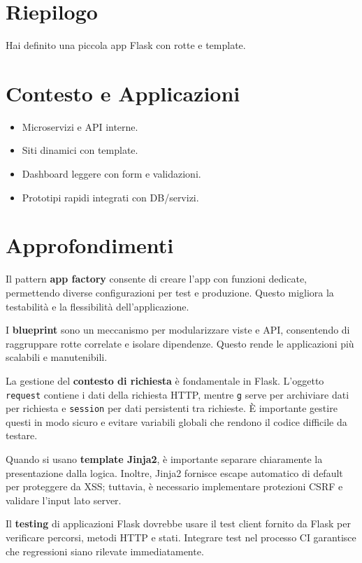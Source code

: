 \section{Riepilogo}
Hai definito una piccola app Flask con rotte e template.

\section{Contesto e Applicazioni}
\begin{tcolorbox}[title=Contesto e Applicazioni]
\begin{itemize}
  \item Microservizi e API interne.
  \item Siti dinamici con template.
  \item Dashboard leggere con form e validazioni.
  \item Prototipi rapidi integrati con DB/servizi.
\end{itemize}
\end{tcolorbox}

\section{Approfondimenti}
\begin{tcolorbox}[title=Spiegazioni dettagliate]
Il pattern \textbf{app factory} consente di creare l'app con funzioni dedicate, permettendo diverse configurazioni per test e produzione. Questo migliora la testabilità e la flessibilità dell'applicazione.

I \textbf{blueprint} sono un meccanismo per modularizzare viste e API, consentendo di raggruppare rotte correlate e isolare dipendenze. Questo rende le applicazioni più scalabili e manutenibili.

La gestione del \textbf{contesto di richiesta} è fondamentale in Flask. L'oggetto \verb|request| contiene i dati della richiesta HTTP, mentre \verb|g| serve per archiviare dati per richiesta e \verb|session| per dati persistenti tra richieste. È importante gestire questi in modo sicuro e evitare variabili globali che rendono il codice difficile da testare.

Quando si usano \textbf{template Jinja2}, è importante separare chiaramente la presentazione dalla logica. Inoltre, Jinja2 fornisce escape automatico di default per proteggere da XSS; tuttavia, è necessario implementare protezioni CSRF e validare l'input lato server.

Il \textbf{testing} di applicazioni Flask dovrebbe usare il test client fornito da Flask per verificare percorsi, metodi HTTP e stati. Integrare test nel processo CI garantisce che regressioni siano rilevate immediatamente.
\end{tcolorbox}

